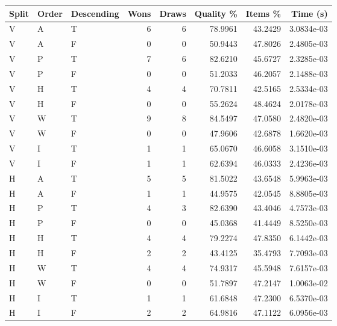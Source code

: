\begin{tabular}{lllrrrrr}
\hline
Split & Order & Descending & Wons & Draws & Quality \% & Items \% & Time (s)   \\
\hline
V     & A     & T          & 6    & 6     & 78.9961    & 43.2429  & 3.0834e-03 \\
V     & A     & F          & 0    & 0     & 50.9443    & 47.8026  & 2.4805e-03 \\
V     & P     & T          & 7    & 6     & 82.6210    & 45.6727  & 2.3285e-03 \\
V     & P     & F          & 0    & 0     & 51.2033    & 46.2057  & 2.1488e-03 \\
V     & H     & T          & 4    & 4     & 70.7811    & 42.5165  & 2.5334e-03 \\
V     & H     & F          & 0    & 0     & 55.2624    & 48.4624  & 2.0178e-03 \\
V     & W     & T          & 9    & 8     & 84.5497    & 47.0580  & 2.4820e-03 \\
V     & W     & F          & 0    & 0     & 47.9606    & 42.6878  & 1.6620e-03 \\
V     & I     & T          & 1    & 1     & 65.0670    & 46.6058  & 3.1510e-03 \\
V     & I     & F          & 1    & 1     & 62.6394    & 46.0333  & 2.4236e-03 \\
H     & A     & T          & 5    & 5     & 81.5022    & 43.6548  & 5.9963e-03 \\
H     & A     & F          & 1    & 1     & 44.9575    & 42.0545  & 8.8805e-03 \\
H     & P     & T          & 4    & 3     & 82.6390    & 43.4046  & 4.7573e-03 \\
H     & P     & F          & 0    & 0     & 45.0368    & 41.4449  & 8.5250e-03 \\
H     & H     & T          & 4    & 4     & 79.2274    & 47.8350  & 6.1442e-03 \\
H     & H     & F          & 2    & 2     & 43.4125    & 35.4793  & 7.7093e-03 \\
H     & W     & T          & 4    & 4     & 74.9317    & 45.5948  & 7.6157e-03 \\
H     & W     & F          & 0    & 0     & 51.7897    & 47.2147  & 1.0063e-02 \\
H     & I     & T          & 1    & 1     & 61.6848    & 47.2300  & 6.5370e-03 \\
H     & I     & F          & 2    & 2     & 64.9816    & 47.1122  & 6.0956e-03 \\

\end{tabular}
